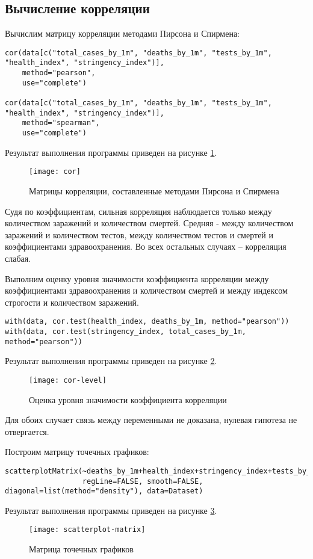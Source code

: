 \documentclass[a4paper,14pt]{extarticle}
\begin{document}
\subsection{Вычисление корреляции}
Вычислим матрицу корреляции методами Пирсона и Спирмена:
\begin{lstlisting}
cor(data[c("total_cases_by_1m", "deaths_by_1m", "tests_by_1m", "health_index", "stringency_index")],
    method="pearson",
    use="complete")

cor(data[c("total_cases_by_1m", "deaths_by_1m", "tests_by_1m", "health_index", "stringency_index")],
    method="spearman",
    use="complete")
\end{lstlisting}
Результат выполнения программы приведен на рисунке \ref{fig:cor}.
\begin{figure}[H]
    \centering
    \texttt{[image: cor]}
    \caption{Матрицы корреляции, составленные методами Пирсона и Спирмена}
    \label{fig:cor}
\end{figure}

Судя по коэффициентам, сильная корреляция наблюдается только между количеством
заражений и количеством смертей. Средняя - между количеством заражений и
количеством тестов, между количеством тестов и смертей и коэффициентами
здравоохранения. Во всех остальных случаях -- корреляция слабая.

Выполним оценку уровня значимости коэффициента корреляции между коэффициентами
здравоохранения и количеством смертей и между индексом строгости и количеством
заражений.
\begin{lstlisting}
with(data, cor.test(health_index, deaths_by_1m, method="pearson"))
with(data, cor.test(stringency_index, total_cases_by_1m, method="pearson"))
\end{lstlisting}
Результат выполнения программы приведен на рисунке \ref{fig:cor-level}.
\begin{figure}[H]
    \centering
    \texttt{[image: cor-level]}
    \caption{Оценка уровня значимости коэффициента корреляции}
    \label{fig:cor-level}
\end{figure}

Для обоих случает связь между переменными не доказана, нулевая гипотеза не
отвергается.

Построим матрицу точечных графиков:
\begin{lstlisting}
scatterplotMatrix(~deaths_by_1m+health_index+stringency_index+tests_by_1m+total_cases_by_1m,
                  regLine=FALSE, smooth=FALSE, diagonal=list(method="density"), data=Dataset)
\end{lstlisting}
Результат выполнения программы приведен на рисунке \ref{fig:scatterplot-matrix}.
\begin{figure}[H]
    \centering
    \texttt{[image: scatterplot-matrix]}
    \caption{Матрица точечных графиков}
    \label{fig:scatterplot-matrix}
\end{figure}
\end{document}
